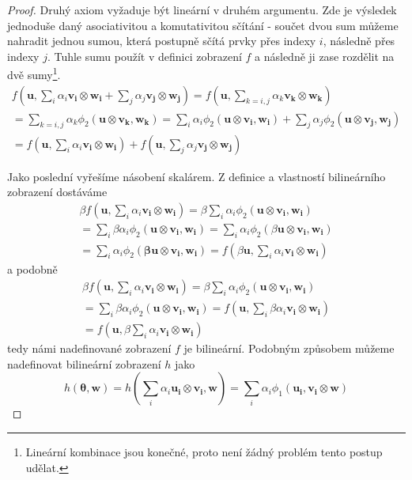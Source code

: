\documentclass[a5paper,12pt]{amsbook}
\theoremstyle{definition}
\newcommand{\myvec}[1]{\mathbf{#1}}
\begin{document}
\begin{proof}
\noindent
Druhý axiom vyžaduje být lineární v druhém argumentu. Zde je výsledek jednoduše daný asociativitou
a komutativitou sčítání - součet dvou sum můžeme nahradit jednou sumou, která postupně sčítá prvky
přes indexy $i$, následně přes indexy $j$. Tuhle sumu použít v definici zobrazení $f$ a následně
ji zase rozdělit na dvě sumy\footnote{Lineární kombinace jsou konečné, proto není žádný problém
tento postup udělat.}.
\begin{equation*}
\begin{split}
f(\myvec{u}, \sum_{i}\alpha_i\myvec{v_i}\otimes\myvec{w_i} + \sum_{j}\alpha_j\myvec{v_j}\otimes\myvec{w_j})
= f(\myvec{u}, \sum_{k=i,j}\alpha_k\myvec{v_k}\otimes\myvec{w_k}) \\
= \sum_{k=i,j}\alpha_k\phi_2(\myvec{u}\otimes\myvec{v_k}, \myvec{w_k})
= \sum_{i}\alpha_i\phi_2(\myvec{u}\otimes\myvec{v_i}, \myvec{w_i})
    + \sum_{j}\alpha_j\phi_2(\myvec{u}\otimes\myvec{v_j}, \myvec{w_j}) \\
= f(\myvec{u}, \sum_{i}\alpha_i\myvec{v_i}\otimes\myvec{w_i}) 
    + f(\myvec{u}, \sum_{j}\alpha_j\myvec{v_j}\otimes\myvec{w_j})
\end{split}
\end{equation*}

\noindent
Jako poslední vyřešíme násobení skalárem. Z definice a vlastností bilineárního zobrazení dostáváme
\begin{equation*}
\begin{split}
\beta f(\myvec{u}, \sum_{i}\alpha_i\myvec{v_i}\otimes\myvec{w_i})
= \beta \sum_{i}\alpha_i\phi_2(\myvec{u}\otimes\myvec{v_i}, \myvec{w_i}) \\
= \sum_{i}\beta\alpha_i\phi_2(\myvec{u}\otimes\myvec{v_i}, \myvec{w_i})
= \sum_{i}\alpha_i\phi_2(\beta\myvec{u}\otimes\myvec{v_i}, \myvec{w_i}) \\
= \sum_{i}\alpha_i\phi_2(\myvec{\beta u}\otimes\myvec{v_i}, \myvec{w_i})
= f(\beta\myvec{u}, \sum_{i}\alpha_i\myvec{v_i}\otimes\myvec{w_i})
\end{split}
\end{equation*}
a podobně
\begin{equation*}
\begin{split}
\beta f(\myvec{u}, \sum_{i}\alpha_i\myvec{v_i}\otimes\myvec{w_i})
= \beta \sum_{i}\alpha_i\phi_2(\myvec{u}\otimes\myvec{v_i}, \myvec{w_i}) \\
= \sum_{i}\beta\alpha_i\phi_2(\myvec{u}\otimes\myvec{v_i}, \myvec{w_i})
= f(\myvec{u}, \sum_{i}\beta\alpha_i\myvec{v_i}\otimes\myvec{w_i}) \\
= f(\myvec{u}, \beta\sum_{i}\alpha_i\myvec{v_i}\otimes\myvec{w_i})
\end{split}
\end{equation*}
tedy námi nadefinované zobrazení $f$ je bilineární. Podobným způsobem můžeme nadefinovat
bilineární zobrazení $h$ jako
\begin{equation*}
h(\myvec{\theta}, \myvec{w}) = h(\sum_{i}\alpha_i\myvec{u_i}\otimes\myvec{v_i}, \myvec{w}) 
= \sum_{i}\alpha_i\phi_1(\myvec{u_i}, \myvec{v_i}\otimes\myvec{w})
\end{equation*}


\end{proof}
\end{document}
